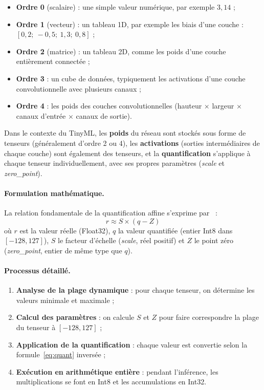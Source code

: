 \begin{itemize}
  \item \textbf{Ordre 0} (scalaire) : une simple valeur numérique, par exemple $3{,}14$ ;
  \item \textbf{Ordre 1} (vecteur) : un tableau 1D, par exemple les biais d'une couche : $[0{,}2;\ -0{,}5;\ 1{,}3;\ 0{,}8]$ ;
  \item \textbf{Ordre 2} (matrice) : un tableau 2D, comme les poids d'une couche entièrement connectée ;
  \item \textbf{Ordre 3} : un cube de données, typiquement les activations d'une couche convolutionnelle avec plusieurs canaux ;
  \item \textbf{Ordre 4} : les poids des couches convolutionnelles (hauteur $\times$ largeur $\times$ canaux d'entrée $\times$ canaux de sortie).
\end{itemize}

Dans le contexte du TinyML, les \textbf{poids} du réseau sont stockés sous forme
de tenseurs (généralement d'ordre 2 ou 4), les \textbf{activations} (sorties
intermédiaires de chaque couche) sont également des tenseurs, et la
\textbf{quantification} s'applique à chaque tenseur individuellement, avec ses
propres paramètres (\emph{scale} et \emph{zero\_point}).

\paragraph{Formulation mathématique.} La relation fondamentale de la
quantification affine s'exprime par~\cite{jacob2018quantization} :
\begin{equation}
  r \approx S \times (q - Z)
  \label{eq:quant}
\end{equation}
où $r$ est la valeur réelle (Float32), $q$ la valeur quantifiée (entier Int8
dans $[-128, 127]$), $S$ le facteur d'échelle (\emph{scale}, réel positif) et
$Z$ le point zéro (\emph{zero\_point}, entier de même type que $q$).

\paragraph{Processus détaillé.}
\begin{enumerate}
  \item \textbf{Analyse de la plage dynamique} : pour chaque tenseur, on
        détermine les valeurs minimale et maximale ;
  \item \textbf{Calcul des paramètres} : on calcule $S$ et $Z$ pour faire
        correspondre la plage du tenseur à $[-128, 127]$ ;
  \item \textbf{Application de la quantification} : chaque valeur est convertie
        selon la formule~\eqref{eq:quant} inversée ;
  \item \textbf{Exécution en arithmétique entière} : pendant l'inférence, les
        multiplications se font en Int8 et les accumulations en Int32.
\end{enumerate}

